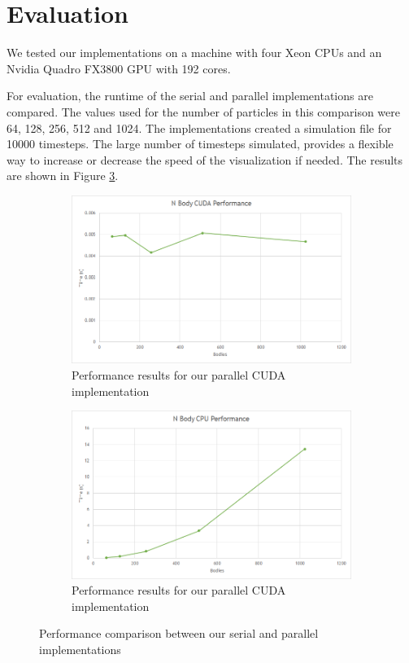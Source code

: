 \documentclass[11pt,a4paper]{article}
\begin{document}
	\section{Evaluation}
	We tested our implementations on a machine with four Xeon CPUs and an Nvidia Quadro FX3800 GPU with 192 cores. 
	
	For evaluation, the runtime of the serial and parallel implementations are compared. The values used for the number of particles in this comparison were 64, 128, 256, 512 and 1024. The implementations created a simulation file for 10000 timesteps. The large number of timesteps simulated, provides a flexible way to increase or decrease the speed of the visualization if needed. The results are shown in Figure \ref{perf}.
	\begin{figure}
		\centering
		\begin{subfigure}[b]{0.45\textwidth}
			\includegraphics[width=\textwidth]{nbody_cuda.png}
			\caption{Performance results for our parallel CUDA implementation}
			\label{nbody_cuda}
		\end{subfigure}
		\begin{subfigure}[b]{0.45\textwidth}
			\includegraphics[width=\textwidth]{nbody_cpu.png}
			\caption{Performance results for our parallel CUDA implementation}
			\label{nbody_cpu}
		\end{subfigure}
		\caption{Performance comparison between our serial and parallel implementations}
		\label{perf}
	\end{figure}
	\pagebreak
	
\end{document}
